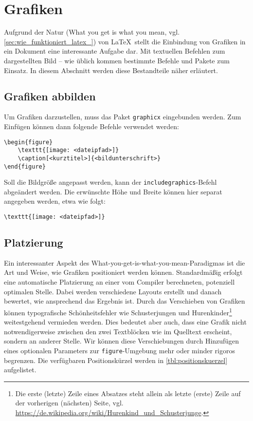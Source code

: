 \section{Grafiken}
\label{sec:grafiken_einbinden}
Aufgrund der Natur (What you get is what you mean, vgl. \cref{sec:wie_funktioniert_latex_}) von \LaTeX \  stellt die Einbindung von Grafiken in ein Dokument eine interessante Aufgabe dar. Mit textuellen Befehlen zum dargestellten Bild -- wie üblich kommen bestimmte Befehle und Pakete zum Einsatz. In diesem Abschnitt werden diese Bestandteile näher erläutert.

\subsection{Grafiken abbilden}
\label{sub:grafiken_abbilden}
Um Grafiken darzustellen, muss das Paket \texttt{graphicx} eingebunden werden. Zum Einfügen können dann folgende Befehle verwendet werden:  

\begin{verbatim}
\begin{figure}
	\texttt{[image: <dateipfad>]}
	\caption[<kurztitel>]{<bildunterschrift>}
\end{figure}
\end{verbatim}

\noindent Soll die Bildgröße angepasst werden, kann der \texttt{includegraphics}-Befehl abgeändert werden. 
Die erwünschte Höhe und Breite können hier separat angegeben werden, etwa wie folgt: 

\begin{verbatim}
\texttt{[image: <dateipfad>]}
\end{verbatim}

\subsection{Platzierung}
\label{sub:platzierung}
Ein interessanter Aspekt des What-you-get-is-what-you-mean-Paradigmas ist die Art und Weise, wie Grafiken positioniert werden können. 
Standardmäßig erfolgt eine automatische Platzierung an einer vom Compiler berechneten, potenziell optimalen Stelle.
Dabei werden verschiedene Layouts erstellt und danach bewertet, wie ansprechend das Ergebnis ist.
Durch das Verschieben von Grafiken können typografische Schönheitsfehler wie Schusterjungen und Hurenkinder\footnote{Die erste (letzte) Zeile eines Absatzes steht allein als letzte (erste) Zeile auf der vorherigen (nächsten) Seite, vgl. \url{https://de.wikipedia.org/wiki/Hurenkind_und_Schusterjunge}.} weitestgehend vermieden werden. 
Dies bedeutet aber auch, dass eine Grafik nicht notwendigerweise zwischen den zwei Textblöcken wie im Quelltext erscheint, sondern an anderer Stelle.
Wir können diese Verschiebungen durch Hinzufügen eines optionalen Parameters zur \texttt{figure}-Umgebung mehr oder minder rigoros begrenzen.
Die verfügbaren Positionskürzel werden in \cref{tbl:positionskuerzel} aufgelistet.

